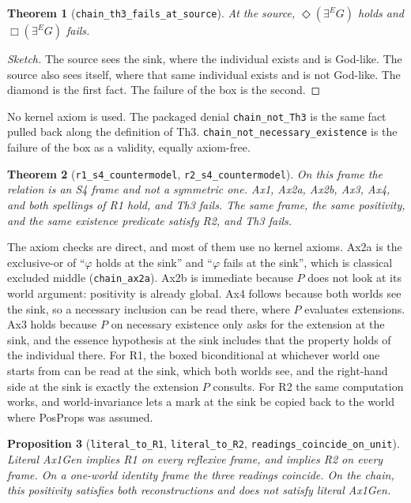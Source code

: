 \documentclass[11pt,a4paper]{article}
\newcommand{\Nec}{\Box}
\newcommand{\Pos}{\Diamond}
\newcommand{\exE}{\exists^{E}}
\newcommand{\lean}[1]{\texttt{#1}}
\newtheorem{theorem}{Theorem}
\newtheorem{proposition}[theorem]{Proposition}
\theoremstyle{definition}
\theoremstyle{remark}
\begin{document}
\begin{theorem}[\lean{chain\_th3\_fails\_at\_source}]
\label{thm:fails}
At the source, \(\Pos(\exE G)\) holds and \(\Nec(\exE G)\) fails.
\end{theorem}

\begin{proof}[Sketch]
The source sees the sink, where the individual exists and is God-like.
The source also sees itself, where that same individual exists and is not
God-like.
The diamond is the first fact.
The failure of the box is the second.
\end{proof}

No kernel axiom is used.
The packaged denial \lean{chain\_not\_Th3} is the same fact pulled back along
the definition of Th3.
\lean{chain\_not\_necessary\_existence} is the failure of the box as a
validity, equally axiom-free.

\begin{theorem}[\lean{r1\_s4\_countermodel}, \lean{r2\_s4\_countermodel}]
\label{thm:r12}
On this frame the relation is an S4 frame and not a symmetric one.
Ax1, Ax2a, Ax2b, Ax3, Ax4, and both spellings of R1 hold, and Th3 fails.
The same frame, the same positivity, and the same existence predicate satisfy
R2, and Th3 fails.
\end{theorem}

The axiom checks are direct, and most of them use no kernel axioms.
Ax2a is the exclusive-or of ``\(\varphi\) holds at the sink'' and ``\(\varphi\)
fails at the sink'', which is classical excluded middle
(\lean{chain\_ax2a}).
Ax2b is immediate because \(P\) does not look at its world argument: positivity
is already global.
Ax4 follows because both worlds see the sink, so a necessary inclusion can be
read there, where \(P\) evaluates extensions.
Ax3 holds because \(P\) on necessary existence only asks for the extension at
the sink, and the essence hypothesis at the sink includes that the property
holds of the individual there.
For R1, the boxed biconditional at whichever world one starts from can be read
at the sink, which both worlds see, and the right-hand side at the sink is
exactly the extension \(P\) consults.
For R2 the same computation works, and world-invariance lets a mark at the
sink be copied back to the world where PosProps was assumed.

\begin{proposition}[\lean{literal\_to\_R1}, \lean{literal\_to\_R2},
  \lean{readings\_coincide\_on\_unit}]
\label{prop:weaker}
Literal Ax1Gen implies R1 on every reflexive frame, and implies R2 on every
frame.
On a one-world identity frame the three readings coincide.
On the chain, this positivity satisfies both reconstructions and does not
satisfy literal Ax1Gen.
\end{proposition}
\end{document}
